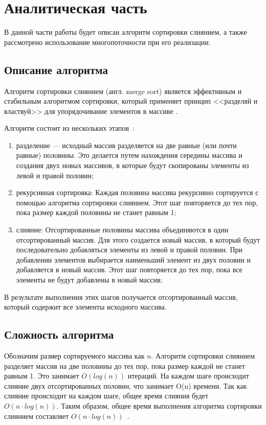 \chapter{Аналитическая часть}
В данной части работы будет описан  алгоритм сортировки слиянием, 
а также рассмотрено использование многопоточности при его реализации.




\section{Описание алгоритма}
Алгоритм сортировки слиянием (англ. merge sort) является эффективным и стабильным алгоритмом сортировки, который применяет принцип <<разделяй и властвуй>> для упорядочивание элементов в массиве \cite{merge-sort}.

Алгоритм состоит из нескольких этапов~\cite{merge-sort}:
\begin{enumerate}
	\item разделение ---  исходный массив разделяется на две равные (или почти равные) половины. Это делается путем нахождения середины массива и создания двух новых массивов, в которые будут скопированы элементы из левой и правой половин;
	
	\item рекурсивная сортировка: Каждая половина массива рекурсивно сортируется с помощью алгоритма сортировки слиянием. Этот шаг повторяется до тех пор, пока размер каждой половины не станет равным 1;

	\item слияние: Отсортированные половины массива объединяются в один отсортированный массив. Для этого создается новый массив, в который будут последовательно добавляться элементы из левой и правой половин. При добавлении элементов выбирается наименьший элемент из двух половин и добавляется в новый массив. Этот шаг повторяется до тех пор, пока все элементы не будут добавлены в новый массив;
\end{enumerate}
В результате выполнения этих шагов получается отсортированный массив, который содержит все элементы исходного массива.

\section{Сложность алгоритма}
Обозначим размер сортируемого массива как $n$. 
Алгоритм сортировки слиянием разделяет массив на две половины до тех пор, пока размер каждой  не станет равным 1. Это занимает $O(log(n))$ итераций.
На каждом шаге происходит слияние двух отсортированных половин, что занимает O(n) времени. Так как слияние происходит на каждом шаге, общее время слияния будет $O(n \cdot log(n))$.
Таким образом, общее время выполнения алгоритма сортировки слиянием составляет $O(n  \cdot log(n))$~\cite{merge-sort}.

